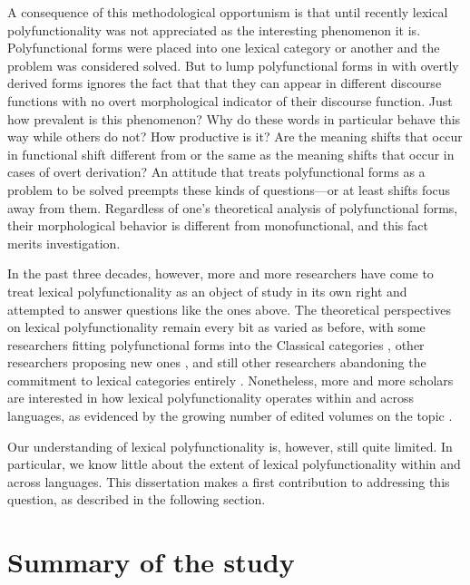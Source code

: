 A consequence of this methodological opportunism is that until recently lexical polyfunctionality was not appreciated as the interesting phenomenon it is. Polyfunctional forms were placed into one lexical category or another and the problem was considered solved. But to lump polyfunctional forms in with overtly derived forms ignores the fact that that they can appear in different discourse functions with no overt morphological indicator of their discourse function. Just how prevalent is this phenomenon? Why do these words in particular behave this way while others do not? How productive is it? Are the meaning shifts that occur in functional shift different from or the same as the meaning shifts that occur in cases of overt derivation? An attitude that treats polyfunctional forms as a problem to be solved preempts these kinds of questions—or at least shifts focus away from them. Regardless of one's theoretical analysis of polyfunctional forms, their morphological behavior is different from monofunctional, and this fact merits investigation.

In the past three decades, however, more and more researchers have come to treat lexical polyfunctionality as an object of study in its own right and attempted to answer questions like the ones above. The theoretical perspectives on lexical polyfunctionality remain every bit as varied as before, with some researchers fitting polyfunctional forms into the Classical categories \parencites{Baker2003}{Dixon2004}{Floyd2011}{Chung2012}{Palmer2017}, other researchers proposing new ones \parencites{HengeveldRijkhoff2005}{Luuk2010}, and still other researchers abandoning the commitment to lexical categories entirely \parencites{Gil1994}{Broschart1997}{Gil2005}. Nonetheless, more and more scholars are interested in how lexical polyfunctionality operates within and across languages, as evidenced by the growing number of edited volumes on the topic \parencites{VogelComrie2000}{LoisVapnarsky2003}{EvansOsada2005}{AnsaldoDonPfau2010}{RijkhoffLier2013}{SimoneMasini2014}{BlaszczakKlimekJankowskaMigdalski2015}{Lier2017}{VapnarskyVeneziano2017a}{VapnarskyVeneziano2017b}{CuyckensHeyvaertHartmann2019}.

Our understanding of lexical polyfunctionality is, however, still quite limited. In particular, we know little about the extent of lexical polyfunctionality within and across languages. This dissertation makes a first contribution to addressing this question, as described in the following section.

\section{Summary of the study}
\label{sec:5.2}

